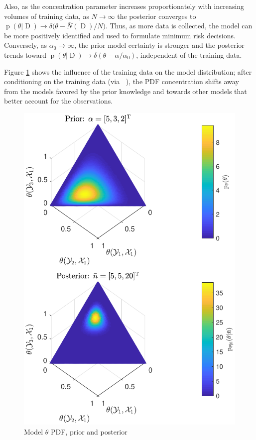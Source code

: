 \documentclass[12pt]{article}
\DeclareMathOperator{\Drm}{\mathrm{D}}
\DeclareMathOperator{\nbarrm}{\bar{\mathrm{n}}}
\DeclareMathOperator{\prm}{\mathrm{p}}
\begin{document}
Also, as the concentration parameter increases proportionately with increasing volumes of training data, as $N \to \infty$ the posterior converges to $\prm(\theta | \Drm) \to \delta\big( \theta - \bar{N}(\Drm) / N \big)$. Thus, as more data is collected, the model can be more positively identified and used to formulate minimum risk decisions. Conversely, as $\alpha_0 \to \infty$, the prior model certainty is stronger and the posterior trends toward $\prm(\theta | \Drm) \to \delta( \theta - \alpha / \alpha_0)$, independent of the training data.

Figure \ref{fig:P_theta_D} shows the influence of the training data on the model distribution; after conditioning on the training data (via $\nbarrm$), the PDF concentration shifts away from the models favored by the prior knowledge and towards other models that better account for the observations.

\begin{figure}
\centering
\includegraphics[scale=1.0]{P_theta_post.pdf}
\caption{Model $\theta$ PDF, prior and posterior}
\label{fig:P_theta_D}
\end{figure}
\end{document}
